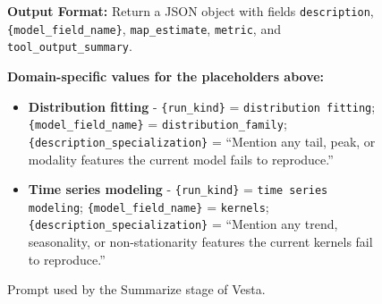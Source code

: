 \documentclass{article}
\newcommand{\method}{{\sc Vesta}}
\begin{document}
\begin{figure}[h]
\begin{mdframed}[linecolor=gray!50, backgroundcolor=gray!5, linewidth=0.8pt]
\medskip
\textbf{Output Format:} Return a JSON object with fields
\texttt{description}, \texttt{\{model\_field\_name\}},
\texttt{map\_estimate}, \texttt{metric}, and \texttt{tool\_output\_summary}.

\medskip
\textbf{Domain-specific values for the placeholders above:}
\begin{itemize}[leftmargin=*, nosep]
    \item \textbf{Distribution fitting} -
          \texttt{\{run\_kind\}} = \texttt{distribution fitting};
          \texttt{\{model\_field\_name\}} = \texttt{distribution\_family};
          \texttt{\{description\_specialization\}} = ``Mention any tail,
          peak, or modality features the current model fails to reproduce.''
    \item \textbf{Time series modeling} -
          \texttt{\{run\_kind\}} = \texttt{time series modeling};
          \texttt{\{model\_field\_name\}} = \texttt{kernels};
          \texttt{\{description\_specialization\}} = ``Mention any trend,
          seasonality, or non-stationarity features the current kernels fail
          to reproduce.''
\end{itemize}

\end{mdframed}
\caption{Prompt used by the Summarize stage of \method{}.}
\label{fig:vesta-summarize-prompt}
\end{figure}




\end{document}
